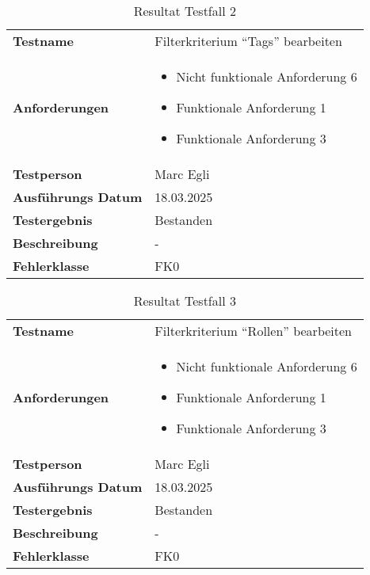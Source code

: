 \begin{table}[H]
    \begin{tabular}{|L{0.3\textwidth}|L{0.65\textwidth}|}
        \hline
           \\[10pt]
        \hline
        \textbf{Testname} & Filterkriterium ``Tags'' bearbeiten \\
        \hline
        \textbf{Anforderungen} & 
        \begin{itemize}
            \item Nicht funktionale Anforderung 6
            \item Funktionale Anforderung 1
            \item Funktionale Anforderung 3
        \end{itemize} \\
        \hline
        \textbf{Testperson} & Marc Egli \\
        \hline
        \textbf{Ausführungs Datum} & 18.03.2025 \\
        \hline
        \textbf{Testergebnis} & Bestanden \\
        \hline
        \textbf{Beschreibung} & - \\ 
        \hline
        \textbf{Fehlerklasse} & FK0 \\ 
        \hline
    \end{tabular}
    \caption{Resultat Testfall 2}
\end{table}

\begin{table}[H]
    \begin{tabular}{|L{0.3\textwidth}|L{0.65\textwidth}|}
        \hline
           \\[10pt]
        \hline
        \textbf{Testname} & Filterkriterium ``Rollen'' bearbeiten \\
        \hline
        \textbf{Anforderungen} & 
        \begin{itemize}
            \item Nicht funktionale Anforderung 6
            \item Funktionale Anforderung 1
            \item Funktionale Anforderung 3
        \end{itemize} \\
        \hline
        \textbf{Testperson} & Marc Egli \\
        \hline
        \textbf{Ausführungs Datum} & 18.03.2025 \\
        \hline
        \textbf{Testergebnis} & Bestanden \\
        \hline
        \textbf{Beschreibung} & - \\ 
        \hline
        \textbf{Fehlerklasse} & FK0 \\ 
        \hline
    \end{tabular}
    \caption{Resultat Testfall 3}
\end{table}

